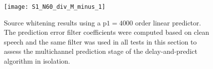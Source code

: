 %


\begin{figure}[H]
	\texttt{[image: S1\_N60\_div\_M\_minus\_1]}
	\centering
	\caption{Source whitening results using a $\mathrm{p1} = 4000$ order linear predictor. The prediction error filter coefficients were computed based on clean speech and the same filter was used in all tests in this section to assess the multichannel prediction stage of the delay-and-predict algorithm in isolation.}
	\label{fig:params_p2_stage1}
\end{figure}


